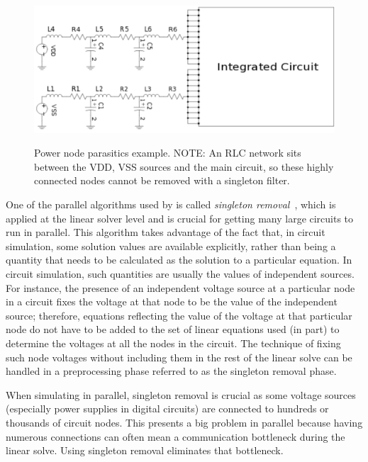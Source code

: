\begin{figure}[b]
\vspace{-5pt}
  \centering
  \scalebox{0.40}
    {\includegraphics{paras_networkv2.pdf}}
\vspace{-5pt}
    \caption[Power node parasitics example.] {Power node parasitics example. 
NOTE:	An RLC network sits between the VDD, VSS sources and the main circuit, so these highly connected nodes cannot be removed with a singleton filter.}
    \label{powerNodeExample}
  \vspace{-10pt}
\end{figure}


One of the parallel algorithms used by \Xyce{} is called \emph{singleton 
removal}~\cite{ICCAD09_precond}, which is applied at the linear solver level and is crucial for getting many large circuits to run in parallel. This algorithm takes advantage of the fact that, in circuit simulation, some solution values are available explicitly, rather than being a quantity that needs to be calculated as the solution to a particular equation. In circuit simulation, such quantities are usually the values of independent sources. For instance, the presence of an independent voltage source at a particular node in a circuit fixes the voltage at that node to be the value of the independent source; therefore, equations reflecting the value of the voltage at that particular node do not have to be added to the set of linear equations used (in part) to determine the voltages at all the nodes in the circuit. The technique of fixing such node voltages without including them in the rest of the linear solve can be handled in a preprocessing phase referred to as the singleton removal phase.  

When simulating in parallel, singleton removal is crucial as some voltage 
sources (especially power supplies in digital circuits) are connected to 
hundreds or thousands of circuit nodes.  This presents a big 
problem in parallel because having numerous connections can often mean a communication 
bottleneck during the linear solve. Using singleton removal eliminates 
that bottleneck.


